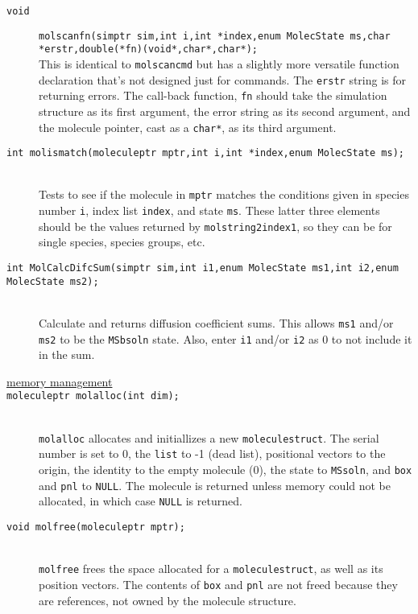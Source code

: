 \documentclass {book}
\newcommand {\ttt} {\texttt}
\begin{document}
\begin{description}
\item[\ttt{void}]
\ttt{molscanfn(simptr sim,int i,int *index,enum MolecState ms,char *erstr,double(*fn)(void*,char*,char*);}
\hfill \\
This is identical to \ttt{molscancmd} but has a slightly more versatile function declaration that's not designed just for commands. The \ttt{erstr} string is for returning errors. The call-back function, \ttt{fn} should take the simulation structure as its first argument, the error string as its second argument, and the molecule pointer, cast as a \ttt{char*}, as its third argument.

\item[\ttt{int molismatch(moleculeptr mptr,int i,int *index,enum MolecState ms);}]
\hfill \\
Tests to see if the molecule in \ttt{mptr} matches the conditions given in species number \ttt{i}, index list \ttt{index}, and state \ttt{ms}. These latter three elements should be the values returned by \ttt{molstring2index1}, so they can be for single species, species groups, etc.

\item[\ttt{int MolCalcDifcSum(simptr sim,int i1,enum MolecState ms1,int i2,enum MolecState ms2);}]
\hfill \\
Calculate and returns diffusion coefficient sums. This allows \ttt{ms1} and/or \ttt{ms2} to be the \ttt{MSbsoln} state. Also, enter \ttt{i1} and/or \ttt{i2} as 0 to not include it in the sum.

\item[\underline{memory management}]

\item[\ttt{moleculeptr molalloc(int dim);}]
\hfill \\
\ttt{molalloc} allocates and initiallizes a new \ttt{moleculestruct}. The serial number is set to 0, the \ttt{list} to -1 (dead list), positional vectors to the origin, the identity to the empty molecule (0), the state to \ttt{MSsoln}, and \ttt{box} and \ttt{pnl} to \ttt{NULL}. The molecule is returned unless memory could not be allocated, in which case \ttt{NULL} is returned.

\item[\ttt{void molfree(moleculeptr mptr);}]
\hfill \\
\ttt{molfree} frees the space allocated for a \ttt{moleculestruct}, as well as its position vectors. The contents of \ttt{box} and \ttt{pnl} are not freed because they are references, not owned by the molecule structure.


\end{description}
\end{document}
